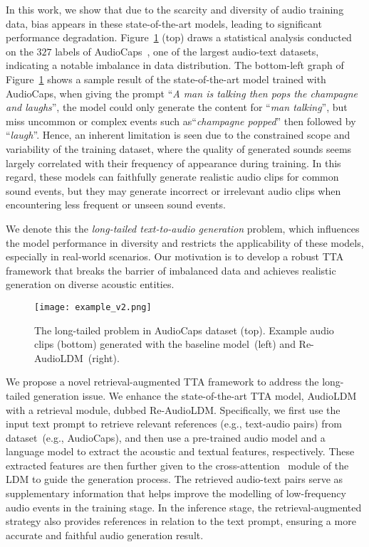 \documentclass{article}
\begin{document}
In this work, we show that due to the scarcity and diversity of audio training data, bias appears in these state-of-the-art models, leading to significant performance degradation. Figure~\ref{frequency} (top) draws a statistical analysis conducted on the $327$ labels of AudioCaps~\cite{audiocaps}, one of the largest audio-text datasets, indicating a notable imbalance in data distribution. The bottom-left graph of Figure~\ref{frequency} shows a sample result of the state-of-the-art model trained with AudioCaps, when giving the prompt ``\textit{A man is talking then pops the champagne and laughs}'', the model could only generate the content for ``\textit{man talking}'', but miss uncommon or complex events such as``\textit{champagne popped}'' then followed by ``\textit{laugh}''. Hence, an inherent limitation is seen due to the constrained scope and variability of the training dataset, where the quality of generated sounds seems largely correlated with their frequency of appearance during training. In this regard, these models can faithfully generate realistic audio clips for common sound events, but they may generate incorrect or irrelevant audio clips when encountering less frequent or unseen sound events. 

We denote this the \textit{long-tailed text-to-audio generation} problem, which influences the model performance in diversity and restricts the applicability of these models, especially in real-world scenarios. 
Our motivation is to develop a robust TTA framework that breaks the barrier of imbalanced data and achieves realistic generation on diverse acoustic entities.

\begin{figure}[t]
    \centering
    \texttt{[image: example\_v2.png]}
    \vspace{-6mm}
    \caption{The long-tailed problem in AudioCaps dataset (top). Example audio clips (bottom) generated with the baseline model~(left) and Re-AudioLDM~(right). }
    \label{frequency}
    \vspace{-1em}
\end{figure}

We propose a novel retrieval-augmented TTA framework to address the long-tailed generation issue. We enhance the state-of-the-art TTA model, AudioLDM~\cite{audioldm} with a retrieval module, dubbed Re-AudioLDM.
Specifically, we first use the input text prompt to retrieve relevant references (e.g., text-audio pairs) from dataset~(e.g., AudioCaps), and then use a pre-trained audio model and a language model to extract the acoustic and textual features, respectively. These extracted features are then further given to the cross-attention~\cite{transformer} module of the LDM to guide the generation process. The retrieved audio-text pairs serve as supplementary information that helps improve the modelling of low-frequency audio events in the training stage. In the inference stage, the retrieval-augmented strategy also provides references in relation to the text prompt, ensuring a more accurate and faithful audio generation result. 
\end{document}
